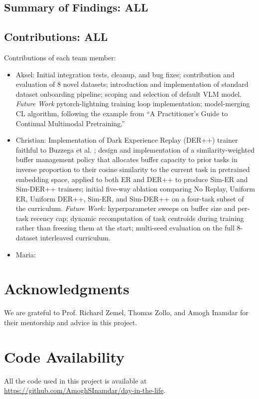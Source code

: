 \documentclass{article}
\begin{document}
\subsection{Summary of Findings: ALL}

\subsection{Contributions: ALL}

Contributions of each team member:
\begin{itemize}
		\item Aksel: Initial integration tests, cleanup, and bug fixes; contribution and evaluation of 8 novel
				datasets; introduction and implementation of standard dataset onboarding pipeline; scoping and
				selection of default VLM model. \textit{Future Work} pytorch-lightning training loop implementation;
				model-merging CL algorithm, following the example from ``A Practitioner's Guide to Continual Multimodal
				Pretraining.'' \cite{fomo-in-flux}
		\item Christian: Implementation of Dark Experience Replay (DER++) trainer
				faithful to Buzzega et al. \cite{der}; design and
				implementation of a similarity-weighted buffer management policy that
				allocates buffer capacity to prior tasks in inverse proportion to their
				cosine similarity to the current task in pretrained embedding space, applied
				to both ER and DER++ to produce Sim-ER and Sim-DER++ trainers; initial
				five-way ablation comparing No Replay, Uniform ER, Uniform DER++, Sim-ER,
				and Sim-DER++ on a four-task subset of the curriculum. \textit{Future Work:}
				hyperparameter sweeps on buffer size and per-task recency cap; dynamic
				recomputation of task centroids during training rather than freezing them
				at the start; multi-seed evaluation on the full 8-dataset interleaved
				curriculum.
		\item Maria:
\end{itemize}

\section*{Acknowledgments}
We are grateful to Prof. Richard Zemel, Thomas Zollo, and Amogh Inamdar for their mentorship and advice in this project.

\section*{Code Availability}
All the code used in this project is available at \url{https://github.com/AmoghSInamdar/day-in-the-life}.
\end{document}
